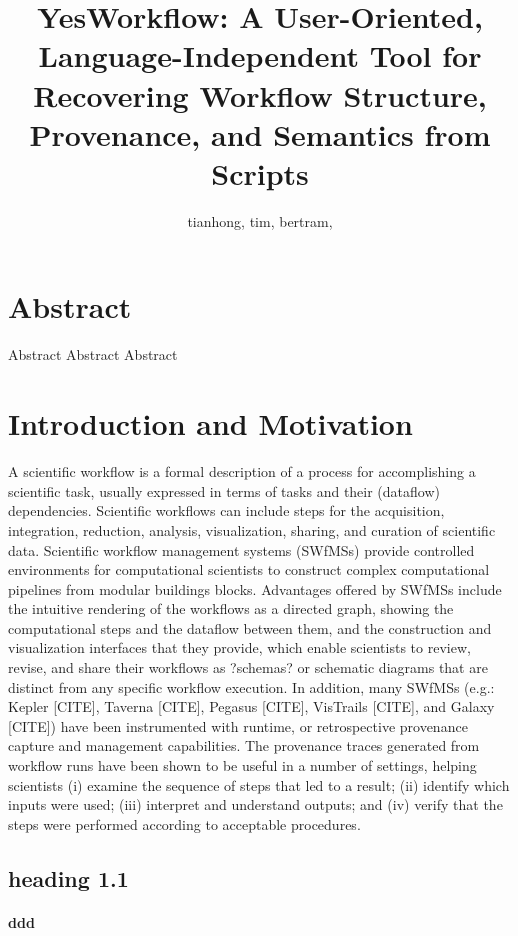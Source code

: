 \documentclass[practice]{ijdc-v9}
\title{YesWorkflow: A User-Oriented, Language-Independent Tool for Recovering Workflow Structure, Provenance, and Semantics from Scripts}
\author{tianhong, tim, bertram,}
\affil{Digital Curation Centre}
\begin{document}
\maketitle

\section{Abstract}
Abstract Abstract   Abstract  
 
\section{Introduction and Motivation}

A scientific workflow\autocite{xie2013dynamic} is a formal description of a process for accomplishing a scientific task, usually expressed in terms of tasks and their (dataflow) dependencies. Scientific workflows can include steps for the acquisition, integration, reduction, analysis, visualization, sharing, and curation of scientific data.  Scientific workflow management systems (SWfMSs) provide controlled environments for computational scientists to construct complex computational pipelines from modular buildings blocks. Advantages offered by SWfMSs include the intuitive rendering of the workflows as a directed graph, showing the computational steps and the dataflow between them, and the construction and visualization interfaces that they provide, which enable scientists to review, revise, and share their workflows as ?schemas? or schematic diagrams that are distinct from any specific workflow execution. In addition, many SWfMSs (e.g.: Kepler [CITE], Taverna [CITE], Pegasus [CITE], VisTrails [CITE], and Galaxy [CITE]) have been instrumented with runtime, or retrospective provenance capture and management capabilities. The provenance traces generated from workflow runs have been shown to be useful in a number of settings, helping scientists (i) examine the sequence of steps that led to a result; (ii) identify which inputs were used; (iii) interpret and understand outputs; and (iv) verify that the steps were performed according to acceptable procedures. 

\subsection{heading 1.1}

\paragraph{ddd}
\end{document}
